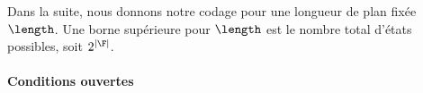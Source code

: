 


Dans la suite, nous donnons notre codage pour une longueur de plan fix\'{e}e $\length$. Une borne sup\'{e}rieure pour $\length$ est le nombre total d'\'{e}tats possibles, soit $2^{\mid\F\mid}$.

\paragraph*{Conditions ouvertes}

